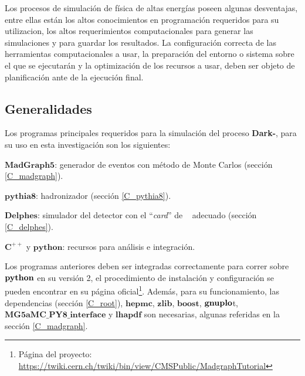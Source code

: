 Los procesos de simulación de física de altas energías poseen algunas desventajas, entre ellas están los altos conocimientos en programación requeridos para su utilizacion, los altos requerimientos computacionales para generar las simulaciones y para guardar los resultados. La configuración correcta de las herramientas computacionales a usar, la preparación del entorno o sistema sobre el que se ejecutarán y la optimización de los recursos a usar, deben ser objeto de planificación ante de la ejecución final.

\subsection{Generalidades}
Los programas principales requeridos para la simulación del proceso \textbf{Dark-}\SUSY, para su uso en esta investigación son los siguientes:
\begin{itemize_f}
\item  $\mathbf{MadGraph5}$: generador de eventos con método de Monte Carlos (sec\-ción \ref{C_madgraph}). 
\item $\mathbf{pythia8}$: hadronizador (sec\-ción \ref{C_pythia8}).
\item $\mathbf{Delphes}$: simulador del detector con el ``\textit{card}'' de \CMS ~ adecuado (sec\-ción \-\ref{C_delphes}).
\item  $\mathbf{C}^{++}$ y $\mathbf{python}$: recursos para análisis e integración.
\end{itemize_f}

Los programas anteriores de\-ben ser integradas correctamente para correr sobre $\mathbf{py\-thon}$ en su versión 2, el procedimiento de instalación y configuración se pueden encontrar en su página oficial\footnote{ Página del proyecto: \href{https://twiki.cern.ch/twiki/bin/view/CMSPublic/MadgraphTutorial}{https://twiki.cern.ch/twiki/bin/view/CMSPublic/MadgraphTutorial}}. %
Además, para su funcionamiento, las dependencias \ROOT (sec\-ción \ref{C_root}), $\mathbf{hepmc}$, $\mathbf{zlib}$, $\mathbf{boost}$, $\mathbf{gnu}\-\mathbf{plo}$t, $\mathbf{MG5aMC\_PY8\_interface}$ y $\mathbf{lhapdf}$ son necesarias, algunas referidas en la sección \ref{C_madgraph}.

